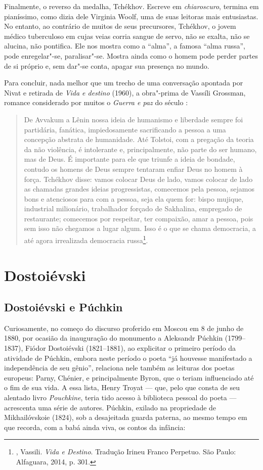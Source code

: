 Finalmente, o reverso da medalha, Tchékhov. Escreve em
\emph{chiaroscuro}, termina em pianíssimo, como dizia dele Virginia
Woolf, uma de suas leitoras mais entusiastas. No entanto, ao contrário
de muitos de seus precursores, Tchékhov, o jovem médico tuberculoso em
cujas veias corria sangue de servo, não se exalta, não se alucina, não
pontifica. Ele nos mostra como a ``alma'', a famosa ``alma russa'', pode
enregelar"-se, paralisar"-se. Mostra ainda como o homem pode perder partes
de si próprio e, sem dar"-se conta, apagar sua presença no mundo.

Para concluir, nada melhor que um trecho de uma conversação apontada por
Nivat e retirada de \emph{Vida e destino} (1960), a obra"-prima de
Vassíli Grossman, romance considerado por muitos o \emph{Guerra e paz}
do século :

\begin{quote}
De Avvakum a Lênin nossa ideia de humanismo e liberdade sempre foi
partidária, fanática, impiedosamente sacrificando a pessoa a uma
concepção abstrata de humanidade. Até Tolstoi, com a pregação da teoria
da não violência, é intolerante e, principalmente, não parte do ser
humano, mas de Deus. É importante para ele que triunfe a ideia de
bondade, contudo os homens de Deus sempre tentaram enfiar Deus no homem
à força. Tchékhov disse: vamos colocar Deus de lado, vamos colocar de
lado as chamadas grandes ideias progressistas, comecemos pela pessoa,
sejamos bons e atenciosos para com a pessoa, seja ela quem for: bispo
mujique, industrial milionário, trabalhador forçado de Sakhalina,
empregado de restaurante; comecemos por respeitar, ter compaixão, amar a
pessoa, pois sem isso não chegamos a lugar algum. Isso é o que se chama
democracia, a até agora irrealizada democracia russa\footnote{,
  Vassili. \emph{Vida e Destino}. Tradução Irineu Franco Perpetuo. São
  Paulo: Alfaguara, 2014, p. 301.}.
\end{quote}


\part{Dostoiévski}

\chapter{Dostoiévski e Púchkin}

Curiosamente, no começo do discurso proferido em Moscou em 8 de junho de
1880, por ocasião da inauguração do monumento a Aleksandr Púchkin
(1799--1837), Fiódor Dostoiévski (1821--1881), ao explicitar o primeiro
período da atividade de Púchkin, embora neste período o poeta ``já houvesse
manifestado a independência de seu gênio'', relaciona nele também as
leituras dos poetas europeus: Parny, Chénier, e principalmente Byron,
que o teriam influenciado até o fim de sua vida. A essa lista, Henry
Troyat --- que, pelo que consta de seu alentado livro \emph{Pouchkine},
teria tido acesso à biblioteca pessoal do poeta --- acrescenta uma série
de autores. Púchkin, exilado na propriedade de Mikhailóvskoie (1824), sob a
desajeitada guarda paterna, ao mesmo tempo em que recorda, com a babá
ainda viva, os contos da infância:

